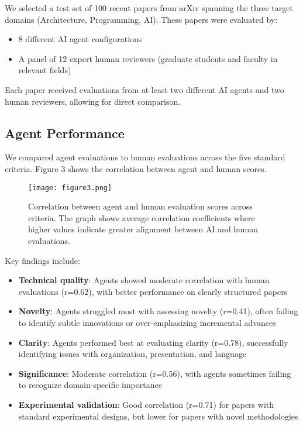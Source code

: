 \documentclass[conference]{IEEEtran}
\begin{document}
We selected a test set of 100 recent papers from arXiv spanning the three target domains (Architecture, Programming, AI). These papers were evaluated by:

\begin{itemize}
    \item 8 different AI agent configurations
    \item A panel of 12 expert human reviewers (graduate students and faculty in relevant fields)
\end{itemize}

Each paper received evaluations from at least two different AI agents and two human reviewers, allowing for direct comparison.

\subsection{Agent Performance}
We compared agent evaluations to human evaluations across the five standard criteria. Figure 3 shows the correlation between agent and human scores.

\begin{figure}[H]
\centering
\texttt{[image: figure3.png]}
\caption{Correlation between agent and human evaluation scores across criteria. The graph shows average correlation coefficients where higher values indicate greater alignment between AI and human evaluations.}
\end{figure}

Key findings include:

\begin{itemize}
    \item \textbf{Technical quality}: Agents showed moderate correlation with human evaluations (r=0.62), with better performance on clearly structured papers
    
    \item \textbf{Novelty}: Agents struggled most with assessing novelty (r=0.41), often failing to identify subtle innovations or over-emphasizing incremental advances
    
    \item \textbf{Clarity}: Agents performed best at evaluating clarity (r=0.78), successfully identifying issues with organization, presentation, and language
    
    \item \textbf{Significance}: Moderate correlation (r=0.56), with agents sometimes failing to recognize domain-specific importance
    
    \item \textbf{Experimental validation}: Good correlation (r=0.71) for papers with standard experimental designs, but lower for papers with novel methodologies
\end{itemize}
\end{document}
